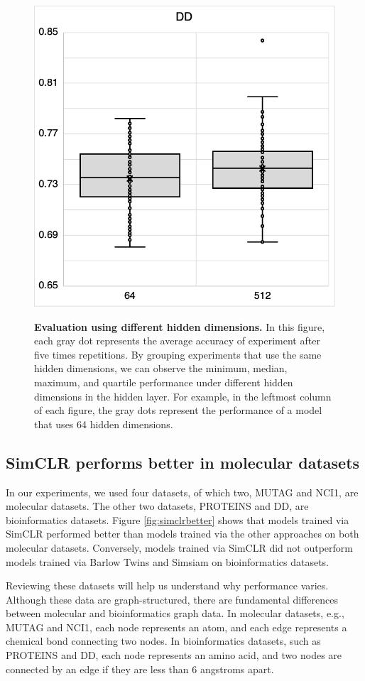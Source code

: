 \begin{figure}[htbp]
{        \includegraphics[width = .48\linewidth]{./figures/5-DD.png}}
\vspace{0.5cm}
\caption[Evaluation using different hidden dimensions]{\textbf{Evaluation using different hidden dimensions.} In this figure, each gray dot represents the average accuracy of experiment after five times repetitions. By grouping experiments that use the same hidden dimensions, we can observe the minimum, median, maximum, and quartile performance under different hidden dimensions in the hidden layer. For example, in the leftmost column of each figure, the gray dots represent the performance of a model that uses 64 hidden dimensions.}\label{fig:hidden}
\end{figure}




\subsection{SimCLR performs better in molecular datasets}


In our experiments, we used four datasets, of which two, MUTAG and NCI1, are molecular datasets. The other two datasets, PROTEINS and DD, are bioinformatics datasets. Figure \ref{fig:simclrbetter} shows that models trained via SimCLR performed better than models trained via the other approaches on both molecular datasets. Conversely, models trained via SimCLR did not outperform models trained via Barlow Twins and Simsiam on bioinformatics datasets.


Reviewing these datasets will help us understand why performance varies. Although these data are graph-structured, there are fundamental differences between molecular and bioinformatics graph data. In molecular datasets, e.g., MUTAG and NCI1, each node represents an atom, and each edge represents a chemical bond connecting two nodes. In bioinformatics datasets, such as PROTEINS and DD, each node represents an amino acid, and two nodes are connected by an edge if they are less than 6 angstroms apart.

